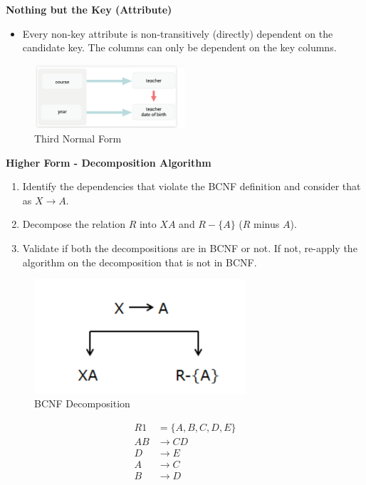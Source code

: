 \documentclass{article}
\begin{document}
\textbf{Nothing but the Key (Attribute)}
\begin{itemize}
    \item Every non-key attribute is non-transitively (directly) dependent on the
          candidate key. The columns can only be dependent on the key columns.
\end{itemize}

\begin{figure}[h]
    \centering
    \includegraphics[width=0.5\textwidth]{assets/third_normal_form.png}
    \caption{Third Normal Form}
\end{figure}

\textbf{Higher Form - Decomposition Algorithm}
\begin{enumerate}
    \item Identify the dependencies that violate the BCNF definition and consider that as
          $X \rightarrow A$.
    \item Decompose the relation $R$ into $XA$ and $R - \{A\}$ ($R$ minus $A$).
    \item Validate if both the decompositions are in BCNF or not. If not, re-apply the
          algorithm on the decomposition that is not in BCNF.
\end{enumerate}

\begin{figure}[h]
    \centering
    \includegraphics[width=0.7\textwidth]{assets/BCNF_decomposition.png}
    \caption{BCNF Decomposition}
\end{figure}

\begin{align*}
    R1 &= \{A, B, C, D, E\} \\
    AB &\rightarrow CD \\
    D &\rightarrow E \\
    A &\rightarrow C \\
    B &\rightarrow D \\
\end{align*}
\end{document}
